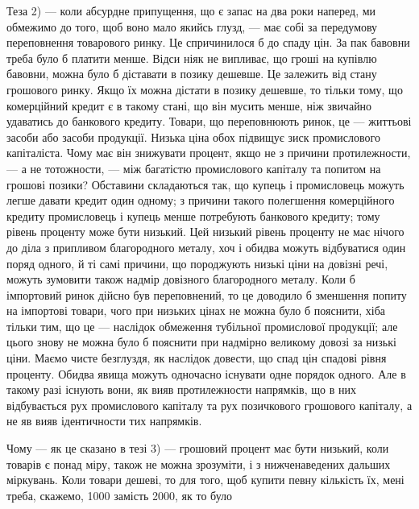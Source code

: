 Теза 2) — коли абсурдне припущення, що є запас на два роки наперед,
ми обмежимо до того, щоб воно мало якийсь глузд, — має собі за передумову
переповнення товарового ринку. Це спричинилося б до спаду цін. За пак бавовни
треба було б платити менше. Відси ніяк не випливає, що гроші на купівлю бавовни,
можна було б діставати в позику дешевше. Це залежить від стану грошового
ринку. Якщо їх можна дістати в позику дешевше, то тільки тому, що комерційний
кредит є в такому стані, що він мусить менше, ніж звичайно удаватись до
банкового кредиту. Товари, що переповнюють ринок, це — життьові засоби або засоби
продукції. Низька ціна обох підвищує зиск промислового капіталіста. Чому
має він знижувати процент, якщо не з причини протилежности, — а не тотожности,
— між багатістю промислового капіталу та попитом на грошові позики?
Обставини складаються так, що купець і промисловець можуть легше давати
кредит один одному; з причини такого полегшення комерційного кредиту промисловець
і купець менше потребують банкового кредиту; тому рівень проценту
може бути низький. Цей низький рівень проценту не має нічого до діла
з припливом благородного металу, хоч і обидва можуть відбуватися один поряд
одного, й ті самі причини, що породжують низькі ціни на довізні речі, можуть
зумовити також надмір довізного благородного металу. Коли б імпортовий ринок
дійсно був переповнений, то це доводило б зменшення попиту на імпортові
товари, чого при низьких цінах не можна було б пояснити, хіба тільки тим,
що це — наслідок обмеження тубільної промислової продукції; але цього знову
не можна було б пояснити при надмірно великому довозі за низькі ціни. Маємо
чисте безглуздя, як наслідок довести, що спад цін \deq{} спадові рівня проценту.
Обидва явища можуть одночасно існувати одне порядок одного. Але в такому
разі існують вони, як вияв протилежности напрямків, що в них відбувається рух
промислового капіталу та рух позичкового грошового капіталу, а не яв вияв
ідентичности тих напрямків.

Чому — як це сказано в тезі 3) — грошовий процент має бути низький,
коли товарів є понад міру, також не можна зрозуміти, і з нижченаведених
дальших міркувань. Коли товари дешеві, то для того, щоб купити певну кількість
їх, мені треба, скажемо, 1000 замість 2000, як то було
\parbreak{}  %
